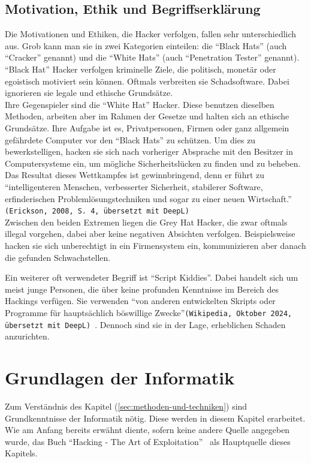 \documentclass[11pt, a4paper]{article}
\begin{document}
\subsection{Motivation, Ethik und Begriffserklärung}
Die Motivationen und Ethiken, die Hacker verfolgen, fallen sehr unterschiedlich aus. Grob kann man sie in zwei Kategorien einteilen: die ``Black Hats'' (auch ``Cracker'' genannt) und die ``White Hats'' (auch ``Penetration Tester'' genannt). \\``Black Hat'' Hacker verfolgen kriminelle Ziele, die politisch, monetär oder egoistisch motiviert sein können. Oftmals verbreiten sie Schadsoftware. Dabei ignorieren sie legale und ethische Grundsätze. \\Ihre Gegenspieler sind die ``White Hat'' Hacker. Diese benutzen dieselben Methoden, arbeiten aber im Rahmen der Gesetze und halten sich an ethische Grundsätze. Ihre Aufgabe ist es, Privatpersonen, Firmen oder ganz allgemein gefährdete Computer vor den ``Black Hats'' zu schützen. Um dies zu bewerkstelligen, hacken sie sich nach vorheriger Absprache mit den Besitzer in Computersysteme ein, um mögliche Sicherheitslücken zu finden und zu beheben. \\ Das Resultat dieses Wettkampfes ist  gewinnbringend, denn er führt zu ``intelligenteren Menschen, verbesserter Sicherheit, stabilerer Software, erfinderischen Problemlösungstechniken und sogar zu einer neuen Wirtschaft.'' \texttt{(Erickson, 2008, S. 4, übersetzt mit DeepL)} \cite{erickson2008hacking}\\Zwischen den beiden Extremen liegen die Grey Hat Hacker, die zwar oftmals illegal vorgehen, dabei aber keine negativen Absichten verfolgen. Beispielsweise hacken sie sich unberechtigt in ein Firmensystem ein, kommunizieren aber danach die gefunden Schwachstellen. \cite{WhiteHatBlackHat:paper, BlackHat34:online}

Ein weiterer oft verwendeter Begriff ist ``Script Kiddies''. Dabei handelt sich um meist junge Personen, die über keine profunden Kenntnisse im Bereich des Hackings verfügen. Sie verwenden ``von anderen entwickelten Skripts oder Programme für hauptsächlich böswillige Zwecke''\texttt{(Wikipedia, Oktober 2024, übersetzt mit DeepL)}~\cite{ScriptkiWikipedia:online}. Dennoch sind sie in der Lage, erheblichen Schaden anzurichten.~\cite{ScriptkiWikipedia:online}

\newpage
\section{Grundlagen der Informatik}\label{sec:grundlagen-der-informatik}
Zum Verständnis des Kapitel  (\ref{sec:methoden-und-techniken}) sind Grundkenntnisse der Informatik nötig. Diese werden in diesem Kapitel erarbeitet. Wie am Anfang bereits erwähnt diente, sofern keine andere Quelle angegeben wurde, das Buch ``Hacking - The Art of Exploitation''~\cite{erickson2008hacking} als Hauptquelle dieses Kapitels.
\end{document}
